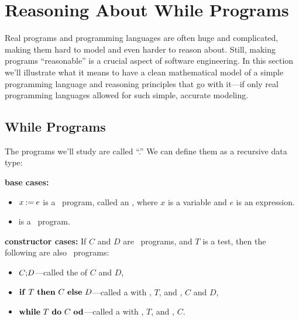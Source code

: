 \section{Reasoning About \textbf{While} Programs}\label{while_chap}

Real programs and programming languages are often huge and complicated,
making them hard to model and even harder to reason about.  Still, making
programs ``reasonable'' is a crucial aspect of software engineering.  In
this section we'll illustrate what it means to have a clean mathematical
model of a simple programming language and reasoning principles that go
with it---if only real programming languages allowed for such simple,
accurate modeling.

\subsection{\textbf{While} Programs}

The programs we'll study are called ``.''  We
can define them as a recursive data type:
\begin{definition}\label{whiledef} \mbox{}

\textbf{base cases:}
\begin{itemize}

\item $x \mathbin{\mathtt{:=}} e$ is a \while\ program, called an , where $x$ is a variable and $e$ is an expression.

\item \term{$\halt$} is a \while\ program.

\end{itemize}

\textbf{constructor cases:}
If $C$ and $D$ are \while\ programs, and $T$ is a test, then the following are also
\while\ programs:
\begin{itemize}

\item $C\mathbf{;}D$---called the  of $C$ and $D$,

\item $\text{\textbf{if}}\ T\ \text{\textbf{then}}\ C\ \text{\textbf{else}}\ D$---called a  with
  , $T$, and , $C$ and $D$,

\item $\text{\textbf{while}}\ T\ \text{\textbf{do}}\ C\ \text{\textbf{od}}$---called a  with ,
  $T$, and , $C$.

\end{itemize}
\end{definition}

